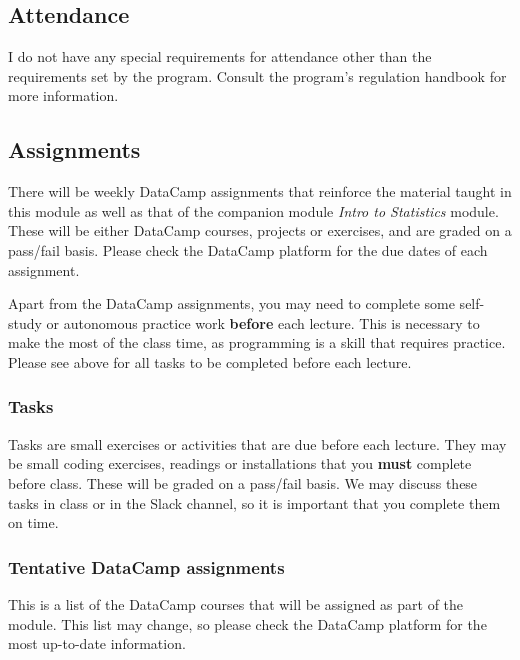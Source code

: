\documentclass[
  letterpaper,
  DIV=11,
  numbers=noendperiod]{scrartcl}
\begin{document}
\subsection{Attendance}\label{attendance}

I do not have any special requirements for attendance other than the
requirements set by the program. Consult the program's regulation
handbook for more information.

\subsection{Assignments}\label{assignments}

There will be weekly DataCamp assignments that reinforce the material
taught in this module as well as that of the companion module
\emph{Intro to Statistics} module. These will be either DataCamp
courses, projects or exercises, and are graded on a pass/fail basis.
Please check the DataCamp platform for the due dates of each assignment.

Apart from the DataCamp assignments, you may need to complete some
self-study or autonomous practice work \textbf{before} each lecture.
This is necessary to make the most of the class time, as programming is
a skill that requires practice. Please see above for all tasks to be
completed before each lecture.

\subsubsection{Tasks}\label{tasks}

Tasks are small exercises or activities that are due before each
lecture. They may be small coding exercises, readings or installations
that you \textbf{must} complete before class. These will be graded on a
pass/fail basis. We may discuss these tasks in class or in the Slack
channel, so it is important that you complete them on time.

\subsubsection{Tentative DataCamp
assignments}\label{tentative-datacamp-assignments}

This is a list of the DataCamp courses that will be assigned as part of
the module. This list may change, so please check the DataCamp platform
for the most up-to-date information.
\end{document}
